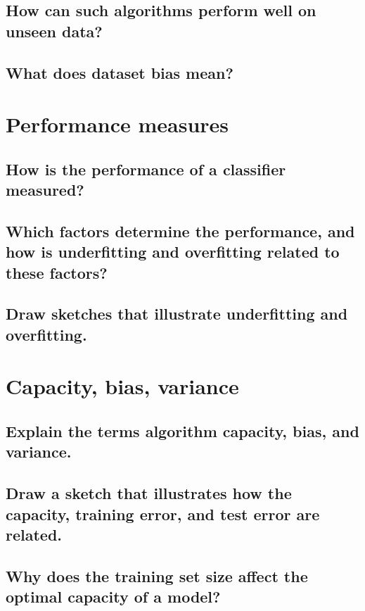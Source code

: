 \subsection{How can such algorithms perform well on unseen data?}

\subsection{What does dataset bias mean? }

\section{Performance measures}

\subsection{How is the performance of a classifier measured?}

\subsection{Which factors determine the performance, and how is underfitting and overfitting related to these factors?}

\subsection{Draw sketches that illustrate underfitting and overfitting.}

\section{Capacity, bias, variance}

\subsection{Explain the terms algorithm capacity, bias, and variance.}

\subsection{Draw a sketch that illustrates how the capacity, training error, and test error are related.}

\subsection{Why does the training set size affect the optimal capacity of a model?}

